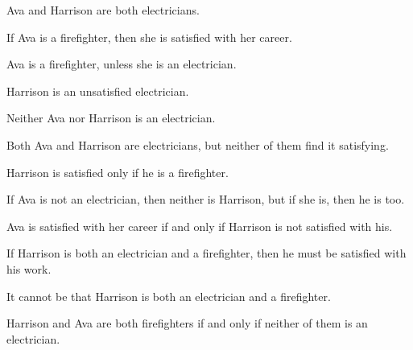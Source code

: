 \begin{earg}
\item Ava and Harrison are both electricians. %
\item If Ava is a firefighter, then she is satisfied with her career. %
\item Ava is a firefighter, unless she is an electrician. %
\item Harrison is an unsatisfied electrician. %
\item Neither Ava nor Harrison is an electrician. %
\item Both Ava and Harrison are electricians, but neither of them find it satisfying. %
\item Harrison is satisfied only if he is a firefighter. %
\item If Ava is not an electrician, then neither is Harrison, but if she is, then he is too. %
\item Ava is satisfied with her career if and only if Harrison is not satisfied with his. %
\item If Harrison is both an electrician and a firefighter, then he must be satisfied with his work. %
\item It cannot be that Harrison is both an electrician and a firefighter. %
\item Harrison and Ava are both firefighters if and only if neither of them is an electrician. %
\end{earg}

